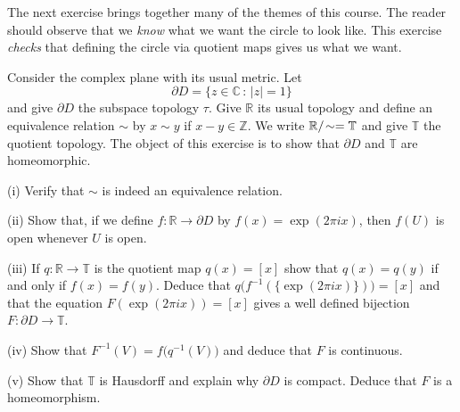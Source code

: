 The next exercise brings together many of the themes of this course.
The reader should observe that we \emph{know} what we want
the circle to look like. This exercise \emph{checks} that
defining the circle via quotient maps gives us what we want.



\begin{problem}\label{P;circle as quotient}
Consider the complex plane with its usual metric.
Let 
\[{\partial}D=\{z\in{\mathbb C}\,:\,|z|=1\}\]
and give ${\partial}D$ the subspace topology $\tau$.
Give ${\mathbb R}$ its usual topology and define
an equivalence relation $\sim$ by $x\sim y$ if $x-y\in{\mathbb Z}$.
We write ${\mathbb R}/\negthinspace\sim={\mathbb T}$ and give ${\mathbb T}$
the quotient topology. The object of this exercise
is to show that ${\partial}D$ and ${\mathbb T}$ are homeomorphic.

(i) Verify that $\sim$ is indeed an equivalence relation.

(ii) Show that, if we define
$f:{\mathbb R}\rightarrow {\partial}D$
by $f(x)=\exp(2\pi ix)$, then $f(U)$ is
open whenever $U$ is open.

(iii) If $q:{\mathbb R}\rightarrow {\mathbb T}$ is the quotient map 
$q(x)=[x]$ show that $q(x)=q(y)$ if and only if $f(x)=f(y)$.
Deduce that $q\big(f^{-1}(\{\exp(2\pi ix)\})\big)=[x]$
and that the equation $F(\exp(2\pi ix))=[x]$ gives a well
defined bijection $F:{\partial}D\rightarrow{\mathbb T}$.

(iv) Show that $F^{-1}(V)=f\big(q^{-1}(V)\big)$ and deduce
that $F$ is continuous.

(v) Show that ${\mathbb T}$ is Hausdorff and explain why
${\partial}D$ is compact. Deduce that $F$ is a homeomorphism.
\end{problem}
